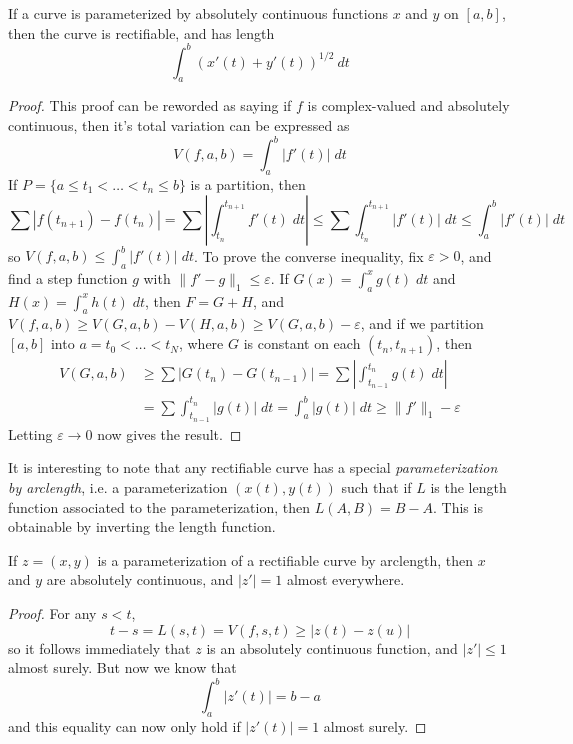 \begin{theorem}
    If a curve is parameterized by absolutely continuous functions $x$ and $y$ on $[a,b]$, then the curve is rectifiable, and has length
    \[ \int_a^b (x'(t) + y'(t))^{1/2}\ dt \]
\end{theorem}
\begin{proof}
  This proof can be reworded as saying if $f$ is complex-valued and absolutely continuous, then it's total variation can be expressed as
  \[ V(f,a,b) = \int_a^b |f'(t)|\; dt \]
  If $P = \{ a \leq t_1 < \dots < t_n \leq b \}$ is a partition, then
  \[ \sum |f(t_{n+1}) - f(t_n)| = \sum \left| \int_{t_n}^{t_{n+1}} f'(t)\; dt \right| \leq \sum \int_{t_n}^{t_{n+1}} |f'(t)|\; dt \leq \int_a^b |f'(t)|\; dt \]
  so $V(f,a,b) \leq \int_a^b |f'(t)|\; dt$. To prove the converse inequality, fix $\varepsilon > 0$, and find a step function $g$ with $\| f' - g \|_1 \leq \varepsilon$. If $G(x) = \int_a^x g(t)\; dt$ and $H(x) = \int_a^x h(t)\; dt$, then $F = G + H$, and $V(f,a,b) \geq V(G,a,b) - V(H,a,b) \geq V(G,a,b) - \varepsilon$, and if we partition $[a,b]$ into $a = t_0 < \dots < t_N$, where $G$ is constant on each $(t_n, t_{n+1})$, then 
  \begin{align*}
    V(G,a,b) &\geq \sum |G(t_n) - G(t_{n-1})| = \sum \left| \int_{t_{n-1}}^{t_n} g(t)\; dt \right|\\
    &= \sum \int_{t_{n-1}}^{t_n} |g(t)|\; dt = \int_a^b |g(t)|\; dt \geq \| f' \|_1 - \varepsilon
  \end{align*}
  Letting $\varepsilon \to 0$ now gives the result.
\end{proof}

It is interesting to note that any rectifiable curve has a special {\it parameterization by arclength}, i.e. a parameterization $(x(t), y(t))$ such that if $L$ is the length function associated to the parameterization, then $L(A,B) = B - A$. This is obtainable by inverting the length function.

\begin{theorem}
  If $z = (x,y)$ is a parameterization of a rectifiable curve by arclength, then $x$ and $y$ are absolutely continuous, and $|z'| = 1$ almost everywhere.
\end{theorem}
\begin{proof}
  For any $s < t$,
  \[ t - s = L(s,t) = V(f,s,t) \geq |z(t) - z(u)| \]
  so it follows immediately that $z$ is an absolutely continuous function, and $|z'| \leq 1$ almost surely. But now we know that
  \[ \int_a^b |z'(t)| = b - a \]
  and this equality can now only hold if $|z'(t)| = 1$ almost surely.
\end{proof}

